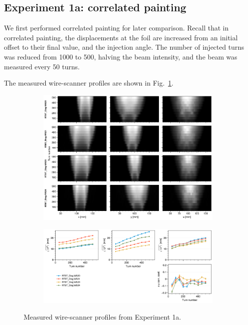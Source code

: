 \subsection{Experiment 1a: correlated painting}

We first performed correlated painting for later comparison. Recall that in correlated painting, the displacements at the foil are increased from an initial offset to their final value, and the injection angle. The number of injected turns was reduced from 1000 to 500, halving the beam intensity, and the beam was measured every 50 turns. 

The measured wire-scanner profiles are shown in Fig.~\ref{fig:exp1a_wsmeas}.
%
\begin{figure}[!p]
    \centering
    \begin{subfigure}{\textwidth}
        \includegraphics[width=\textwidth]{Images/chapter5/exp1a/waterfall.png}
    \end{subfigure}
    \vfill
    \vspace*{1.25cm}
    \vfill
    \begin{subfigure}{\textwidth}
        \includegraphics[width=\textwidth]{Images/chapter5/exp1a/rms.png}
    \end{subfigure}
    \caption{Measured wire-scanner profiles from Experiment 1a.}
    \label{fig:exp1a_wsmeas}
\end{figure}

